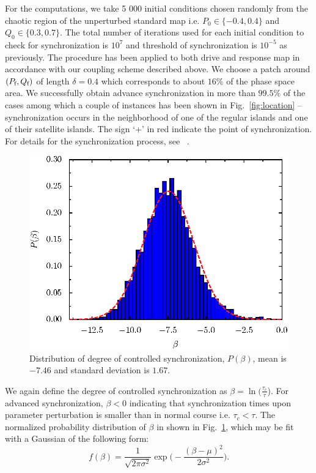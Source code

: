 \documentclass[reprint,amsmath,amssymb,aps,pre]{revtex4-1}
\begin{document}
For the computations, we take 5 000 initial conditions chosen randomly from 
the chaotic region of the unperturbed standard map i.e. $P_0 \in \{-0.4,0.4\}$ 
and $Q_0 \in \{0.3,0.7\}$. The total number of iterations used for each 
initial condition to check for synchronization is $10^7$ and threshold of 
synchronization is $10^{-5}$ as previously.  The procedure has 
been applied to both drive and 
response map in accordance with our coupling  scheme described above. We 
choose a patch around $(P_\textnormal{f},Q_\textnormal{f})$  of length 
$\delta= 0.4$ which corresponds 
to about $16\%$ of the phase space area. We successfully obtain advance 
synchronization in more than $99.5\%$ of the cases among which a  couple of 
instances  has been shown in Fig.~\ref{fig:location} -- synchronization occurs 
in the neighborhood of one of the regular islands and one of their satellite 
islands.  The sign `+' in red indicate the point of synchronization. For 
details for the synchronization process, see ~\cite{Mahata2016,Das2017}.
\begin{figure}[h]
    \includegraphics[scale=0.7]{sync_time_beta.eps}
    \caption{\label{fig:beta_dist}\footnotesize Distribution of degree of 
        controlled synchronization, $P(\beta)$, mean is $-7.46$ and standard 
        deviation is $1.67$.}
\end{figure}
We again define the degree of controlled synchronization as $\beta = \ln 
(\frac{\tau_c}{\tau}$). For advanced synchronization, $\beta < 0$ indicating 
that synchronization times upon parameter perturbation is smaller than in 
normal course i.e. $\tau_c < \tau$. The normalized probability distribution of 
$\beta$ in shown in Fig.~\ref{fig:beta_dist}, which may be fit with a Gaussian 
of the following form:
\begin{equation}
f(\beta) =  
\frac{1}{\sqrt{2\pi\sigma^2}}\exp\Big(-\frac{(\beta-\mu)^2}{2\sigma^2}\Big).
\end{equation}
\end{document}
